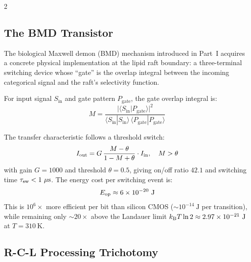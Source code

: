 \begin{multicols}{2}
\subsection{The BMD Transistor}

The biological Maxwell demon (BMD) mechanism introduced in Part~I acquires a concrete physical implementation at the lipid raft boundary: a three-terminal switching device whose ``gate'' is the overlap integral between the incoming categorical signal and the raft's selectivity function.

\begin{definition}
\label{def:bmd_transistor}
For input signal $S_{\mathrm{in}}$ and gate pattern $P_{\mathrm{gate}}$, the gate overlap integral is:
\begin{equation}
M = \frac{|\langle S_{\mathrm{in}} | P_{\mathrm{gate}} \rangle|^2}{\langle S_{\mathrm{in}} | S_{\mathrm{in}} \rangle\,\langle P_{\mathrm{gate}} | P_{\mathrm{gate}} \rangle}
\label{eq:ch11_gate}
\end{equation}
\end{definition}

The transfer characteristic follows a threshold switch:
\begin{equation}
I_{\mathrm{out}} = G\,\frac{M - \theta}{1 - M + \theta}\cdot I_{\mathrm{in}}, \quad M > \theta
\label{eq:ch11_transfer}
\end{equation}
with gain $G = 1000$ and threshold $\theta = 0.5$, giving on/off ratio $42.1$ and switching time $\tausw < 1\ \mu\mathrm{s}$. The energy cost per switching event is:
\begin{equation}
E_{\mathrm{op}} \approx 6 \times 10^{-20}\ \mathrm{J}
\label{eq:ch11_eop}
\end{equation}
This is $10^6\times$ more efficient per bit than silicon CMOS ($\sim 10^{-14}\ \mathrm{J}$ per transition), while remaining only $\sim 20\times$ above the Landauer limit $k_{\mathrm{B}} T\ln 2 \approx 2.97 \times 10^{-21}\ \mathrm{J}$ at $T = 310\ \mathrm{K}$.

\subsection{R-C-L Processing Trichotomy}


\end{multicols}
